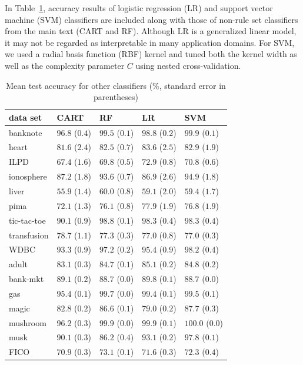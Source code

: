 \documentclass[twoside,11pt]{article}
\begin{document}
In Table~\ref{tbl:suppOtherAcc}, accuracy results of logistic regression (LR) and support vector machine (SVM) classifiers are included along with those of non-rule set classifiers from the main text (CART and RF).  Although LR is a generalized linear model, it may not be regarded as interpretable in many application domains.  For SVM, we used a radial basis function (RBF) kernel and tuned both the kernel width as well as the complexity parameter $C$ using nested cross-validation.

\begin{table}
\caption{Mean test accuracy for other classifiers (\%, standard error in parentheses)}
\label{tbl:suppOtherAcc}
\centering
\begin{tabular}{lllll}
\toprule
data set&CART&RF&LR&SVM\\
\midrule
banknote&$96.8$ ($0.4$)&$99.5$ ($0.1$)&$98.8$ ($0.2$)&$99.9$ ($0.1$)\\
heart&$81.6$ ($2.4$)&$82.5$ ($0.7$)&$83.6$ ($2.5$)&$82.9$ ($1.9$)\\
ILPD&$67.4$ ($1.6$)&$69.8$ ($0.5$)&$72.9$ ($0.8$)&$70.8$ ($0.6$)\\
ionosphere&$87.2$ ($1.8$)&$93.6$ ($0.7$)&$86.9$ ($2.6$)&$94.9$ ($1.8$)\\
liver&$55.9$ ($1.4$)&$60.0$ ($0.8$)&$59.1$ ($2.0$)&$59.4$ ($1.7$)\\
pima&$72.1$ ($1.3$)&$76.1$ ($0.8$)&$77.9$ ($1.9$)&$76.8$ ($1.9$)\\
tic-tac-toe&$90.1$ ($0.9$)&$98.8$ ($0.1$)&$98.3$ ($0.4$)&$98.3$ ($0.4$)\\
transfusion&$78.7$ ($1.1$)&$77.3$ ($0.3$)&$77.0$ ($0.8$)&$77.0$ ($0.3$)\\
WDBC&$93.3$ ($0.9$)&$97.2$ ($0.2$)&$95.4$ ($0.9$)&$98.2$ ($0.4$)\\
\midrule
adult&$83.1$ ($0.3$)&$84.7$ ($0.1$)&$85.1$ ($0.2$)&$84.8$ ($0.2$)\\
bank-mkt&$89.1$ ($0.2$)&$88.7$ ($0.0$)&$89.8$ ($0.1$)&$88.7$ ($0.0$)\\
gas&$95.4$ ($0.1$)&$99.7$ ($0.0$)&$99.4$ ($0.1$)&$99.5$ ($0.1$)\\
magic&$82.8$ ($0.2$)&$86.6$ ($0.1$)&$79.0$ ($0.2$)&$87.7$ ($0.3$)\\
mushroom&$96.2$ ($0.3$)&$99.9$ ($0.0$)&$99.9$ ($0.1$)&$100.0$ ($0.0$)\\
musk&$90.1$ ($0.3$)&$86.2$ ($0.4$)&$93.1$ ($0.2$)&$97.8$ ($0.1$)\\
FICO&$70.9$ ($0.3$)&$73.1$ ($0.1$)&$71.6$ ($0.3$)&$72.3$ ($0.4$)\\
\bottomrule
\end{tabular}
\end{table}
\end{document}
